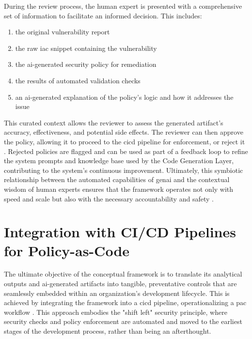 During the review process, the human expert is presented with a comprehensive set of information to facilitate an informed decision. This includes:
\begin{enumerate}
    \item the original vulnerability report
    \item the raw \gls{iac} snippet containing the vulnerability
    \item the \gls{ai}-generated security policy for remediation
    \item the results of automated validation checks
    \item an \gls{ai}-generated explanation of the policy’s logic and how it addresses the issue
\end{enumerate}

This curated context allows the reviewer to assess the generated artifact's accuracy, effectiveness, and potential side effects. The reviewer can then approve the policy, allowing it to proceed to the \gls{cicd} pipeline for enforcement, or reject it \cite{noauthor_human---loop_nodate}. Rejected policies are flagged and can be used as part of a feedback loop to refine the system prompts and knowledge base used by the Code Generation Layer, contributing to the system's continuous improvement. Ultimately, this symbiotic relationship between the automated capabilities of \gls{genai} and the contextual wisdom of human experts ensures that the framework operates not only with speed and scale but also with the necessary accountability and safety  \cite{noauthor_human---loop_nodate}.


\section{Integration with CI/CD Pipelines for Policy-as-Code} %
\label{sec:Integration with CI/CD Pipelines for Policy-as-Code}

The ultimate objective of the conceptual framework is to translate its analytical outputs and \gls{ai}-generated artifacts into tangible, preventative controls that are seamlessly embedded within an organization's development lifecycle. This is achieved by integrating the framework into a \gls{cicd} pipeline, operationalizing a \gls{pac} workflow \cite{sarathe_krisshnan_jutoo_vijayaraghavan_policy_2025}. This approach embodies the "shift left" security principle, where security checks and policy enforcement are automated and moved to the earliest stages of the development process, rather than being an afterthought.

